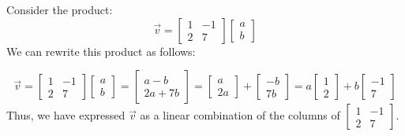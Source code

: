 \documentclass{ximera}
\begin{document}
\begin{exploration}\label{init:prodaslincomb}
Consider the product:
$$\vec{v}=\begin{bmatrix}
1&-1\\
2&7
\end{bmatrix}\begin{bmatrix} a\\b\end{bmatrix}$$
We can rewrite this product as follows:

$$\vec{v}=\begin{bmatrix}
1&-1\\
2&7
\end{bmatrix}\begin{bmatrix} a\\b\end{bmatrix}=\begin{bmatrix} a-b\\2a+7b\end{bmatrix}=\begin{bmatrix} a\\2a\end{bmatrix}+\begin{bmatrix} -b\\7b\end{bmatrix}=a\begin{bmatrix} 1\\2\end{bmatrix}+b\begin{bmatrix} -1\\7\end{bmatrix}$$
Thus, we have expressed $\vec{v}$ as a linear combination of the columns of $\begin{bmatrix}
1&-1\\
2&7
\end{bmatrix}$. 

\end{exploration}
\end{document}
